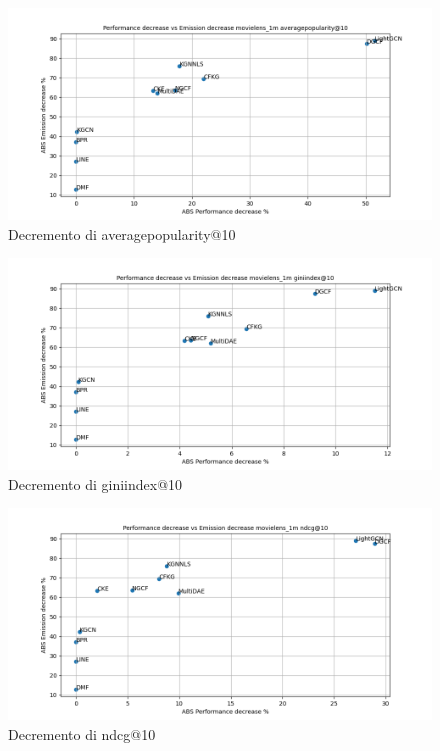 \begin{figure}[H]
    \centering
    \includegraphics[scale=0.5]{images/decrement_averagepopularity@10_movielens_1m_40_6.png}
    \caption{Decremento di averagepopularity@10}
\end{figure}

\begin{figure}[H]
    \centering
    \includegraphics[scale=0.5]{images/decrement_giniindex@10_movielens_1m_40_6.png}
    \caption{Decremento di giniindex@10}
\end{figure}

\begin{figure}[H]
    \centering
    \includegraphics[scale=0.5]{images/decrement_ndcg@10_movielens_1m_40_6.png}
    \caption{Decremento di ndcg@10}
\end{figure}

